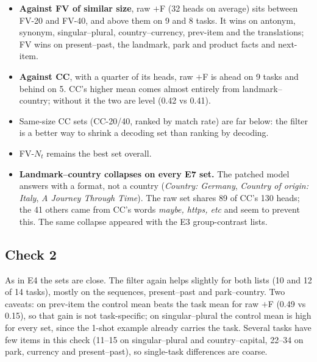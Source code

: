 \documentclass[10pt,a4paper]{article}
\begin{document}
\begin{itemize}
\item \textbf{Against FV of similar size}, raw $+$F (32 heads on average) sits between FV-20 and FV-40, and above them on 9 and 8 tasks. It wins on antonym, synonym, singular--plural, country--currency, prev-item and the translations; FV wins on present--past, the landmark, park and product facts and next-item.
\item \textbf{Against CC}, with a quarter of its heads, raw $+$F is ahead on 9 tasks and behind on 5. CC's higher mean comes almost entirely from landmark--country; without it the two are level (0.42 vs 0.41).
\item Same-size CC sets (CC-20/40, ranked by match rate) are far below: the filter is a better way to shrink a decoding set than ranking by decoding.
\item FV-$N_t$ remains the best set overall.
\item \textbf{Landmark--country collapses on every E7 set.} The patched model answers with a format, not a country (\emph{Country: Germany}, \emph{Country of origin: Italy}, \emph{A Journey Through Time}). The raw set shares 89 of CC's 130 heads; the 41 others came from CC's words \emph{maybe, https, etc} and seem to prevent this. The same collapse appeared with the E3 group-contrast lists.
\end{itemize}

\subsection{Check 2}

\begin{table}[H]\centering\small
\resizebox{\linewidth}{!}{}
\caption{Check 2 (1-shot prompts answered wrongly), task accuracy at the cross-fitted $\alpha$. Random controls not run in this check.}
\label{tab:check2}
\end{table}

As in E4 the sets are close. The filter again helps slightly for both lists (10 and 12 of 14 tasks), mostly on the sequences, present--past and park--country. Two caveats: on prev-item the control mean beats the task mean for raw $+$F (0.49 vs 0.15), so that gain is not task-specific; on singular--plural the control mean is high for every set, since the 1-shot example already carries the task. Several tasks have few items in this check (11--15 on singular--plural and country--capital, 22--34 on park, currency and present--past), so single-task differences are coarse.
\end{document}
